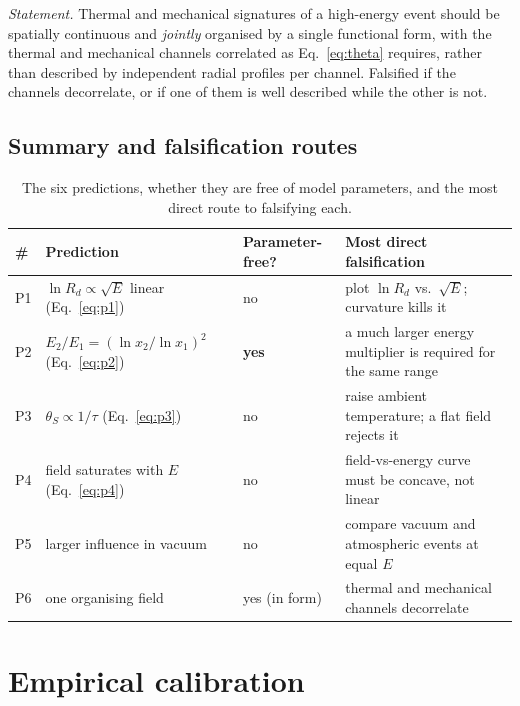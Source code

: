 \documentclass[11pt,a4paper]{article}
\newcommand{\thetaS}{\theta_{S}}
\newcommand{\tgrad}{\tau}
\begin{document}
\emph{Statement.} Thermal and mechanical signatures of a high-energy event
should be spatially continuous and \emph{jointly} organised by a single
functional form, with the thermal and mechanical channels correlated as
Eq.~\eqref{eq:theta} requires, rather than described by independent radial
profiles per channel. Falsified if the channels decorrelate, or if one of
them is well described while the other is not.

\subsection{Summary and falsification routes}

\begin{table}[tb]
  \centering
  \caption{The six predictions, whether they are free of model parameters,
  and the most direct route to falsifying each.}
  \label{tab:predictions}
  \begin{tabular}{@{}p{0.7cm}p{4.5cm}p{2.4cm}p{6.5cm}@{}}
    \toprule
    \textbf{\#} & \textbf{Prediction} & \textbf{Parameter-free?} &
    \textbf{Most direct falsification} \\
    \midrule
    P1 & $\ln R_d \propto \sqrt{E}$ linear (Eq.~\eqref{eq:p1}) & no &
        plot $\ln R_d$ vs.\ $\sqrt{E}$; curvature kills it \\
    P2 & $E_2/E_1 = (\ln x_2/\ln x_1)^2$ (Eq.~\eqref{eq:p2}) & \textbf{yes} &
        a much larger energy multiplier is required for the same range \\
    P3 & $\thetaS \propto 1/\tgrad$ (Eq.~\eqref{eq:p3}) & no &
        raise ambient temperature; a flat field rejects it \\
    P4 & field saturates with $E$ (Eq.~\eqref{eq:p4}) & no &
        field-vs-energy curve must be concave, not linear \\
    P5 & larger influence in vacuum & no &
        compare vacuum and atmospheric events at equal $E$ \\
    P6 & one organising field & yes (in form) &
        thermal and mechanical channels decorrelate \\
    \bottomrule
  \end{tabular}
\end{table}

\section{Empirical calibration}
\label{sec:calibration}
\end{document}
